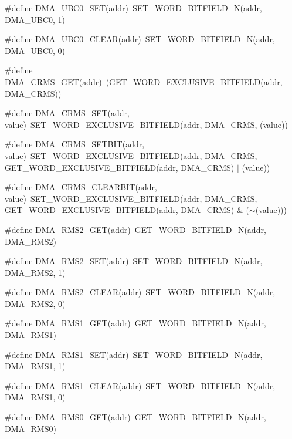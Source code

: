 \begin{DoxyCompactItemize}
\item 
\#define \hyperlink{a00548_a3ecc19116e71cc2320727a303dee2634}{DMA\_\-UBC0\_\-SET}(addr)~SET\_\-WORD\_\-BITFIELD\_\-N(addr, DMA\_\-UBC0, 1)
\item 
\#define \hyperlink{a00548_a6ae3d579ebb21f3a99df20964e414f82}{DMA\_\-UBC0\_\-CLEAR}(addr)~SET\_\-WORD\_\-BITFIELD\_\-N(addr, DMA\_\-UBC0, 0)
\item 
\#define \hyperlink{a00548_aae488d47faa4bf49ffeeee8e7e079568}{DMA\_\-CRMS\_\-GET}(addr)~(GET\_\-WORD\_\-EXCLUSIVE\_\-BITFIELD(addr, DMA\_\-CRMS))
\item 
\#define \hyperlink{a00548_a619c2f69f427670dcad8dedb0edb67cb}{DMA\_\-CRMS\_\-SET}(addr, value)~SET\_\-WORD\_\-EXCLUSIVE\_\-BITFIELD(addr, DMA\_\-CRMS, (value))
\item 
\#define \hyperlink{a00548_ab03d36c6275bb08d248021da031fb826}{DMA\_\-CRMS\_\-SETBIT}(addr, value)~SET\_\-WORD\_\-EXCLUSIVE\_\-BITFIELD(addr, DMA\_\-CRMS, GET\_\-WORD\_\-EXCLUSIVE\_\-BITFIELD(addr, DMA\_\-CRMS) $|$ (value))
\item 
\#define \hyperlink{a00548_aa46de22d629552f1da9ddb756538d0bd}{DMA\_\-CRMS\_\-CLEARBIT}(addr, value)~SET\_\-WORD\_\-EXCLUSIVE\_\-BITFIELD(addr, DMA\_\-CRMS, GET\_\-WORD\_\-EXCLUSIVE\_\-BITFIELD(addr, DMA\_\-CRMS) \& ($\sim$(value)))
\item 
\#define \hyperlink{a00548_a51ef19a37266d47fdd73e13b7e5929aa}{DMA\_\-RMS2\_\-GET}(addr)~GET\_\-WORD\_\-BITFIELD\_\-N(addr, DMA\_\-RMS2)
\item 
\#define \hyperlink{a00548_a8f057811e9148d71087f3abdf22e318f}{DMA\_\-RMS2\_\-SET}(addr)~SET\_\-WORD\_\-BITFIELD\_\-N(addr, DMA\_\-RMS2, 1)
\item 
\#define \hyperlink{a00548_ae667fd9a1539d06789244a6ab6357188}{DMA\_\-RMS2\_\-CLEAR}(addr)~SET\_\-WORD\_\-BITFIELD\_\-N(addr, DMA\_\-RMS2, 0)
\item 
\#define \hyperlink{a00548_a72ebaa02529a20255673fab6b6ce9053}{DMA\_\-RMS1\_\-GET}(addr)~GET\_\-WORD\_\-BITFIELD\_\-N(addr, DMA\_\-RMS1)
\item 
\#define \hyperlink{a00548_ac5da6f34fc8d1ff8e87dcace7cc2922b}{DMA\_\-RMS1\_\-SET}(addr)~SET\_\-WORD\_\-BITFIELD\_\-N(addr, DMA\_\-RMS1, 1)
\item 
\#define \hyperlink{a00548_a598af5bcbff4dd3dd99bd3fec64b5b0d}{DMA\_\-RMS1\_\-CLEAR}(addr)~SET\_\-WORD\_\-BITFIELD\_\-N(addr, DMA\_\-RMS1, 0)
\item 
\#define \hyperlink{a00548_a6b3a3aefa0268529da37432009a1baa5}{DMA\_\-RMS0\_\-GET}(addr)~GET\_\-WORD\_\-BITFIELD\_\-N(addr, DMA\_\-RMS0)

\end{DoxyCompactItemize}
